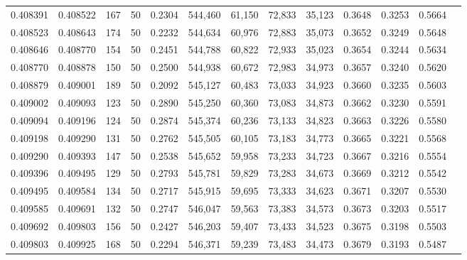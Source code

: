 \begin{tabular}{rrrrrrrrrrrrr}
0.408391 & 0.408522 &   167 &  50 &                                     0.2304 & 544,460 &  61,150 &  72,833 &  35,123 & 0.3648 & 0.3253 & 0.5664 \\
0.408523 & 0.408643 &   174 &  50 &                                     0.2232 & 544,634 &  60,976 &  72,883 &  35,073 & 0.3652 & 0.3249 & 0.5648 \\
0.408646 & 0.408770 &   154 &  50 &                                     0.2451 & 544,788 &  60,822 &  72,933 &  35,023 & 0.3654 & 0.3244 & 0.5634 \\
0.408770 & 0.408878 &   150 &  50 &                                     0.2500 & 544,938 &  60,672 &  72,983 &  34,973 & 0.3657 & 0.3240 & 0.5620 \\
0.408879 & 0.409001 &   189 &  50 &                                     0.2092 & 545,127 &  60,483 &  73,033 &  34,923 & 0.3660 & 0.3235 & 0.5603 \\
0.409002 & 0.409093 &   123 &  50 &                                     0.2890 & 545,250 &  60,360 &  73,083 &  34,873 & 0.3662 & 0.3230 & 0.5591 \\
0.409094 & 0.409196 &   124 &  50 &                                     0.2874 & 545,374 &  60,236 &  73,133 &  34,823 & 0.3663 & 0.3226 & 0.5580 \\
0.409198 & 0.409290 &   131 &  50 &                                     0.2762 & 545,505 &  60,105 &  73,183 &  34,773 & 0.3665 & 0.3221 & 0.5568 \\
0.409290 & 0.409393 &   147 &  50 &                                     0.2538 & 545,652 &  59,958 &  73,233 &  34,723 & 0.3667 & 0.3216 & 0.5554 \\
0.409396 & 0.409495 &   129 &  50 &                                     0.2793 & 545,781 &  59,829 &  73,283 &  34,673 & 0.3669 & 0.3212 & 0.5542 \\
0.409495 & 0.409584 &   134 &  50 &                                     0.2717 & 545,915 &  59,695 &  73,333 &  34,623 & 0.3671 & 0.3207 & 0.5530 \\
0.409585 & 0.409691 &   132 &  50 &                                     0.2747 & 546,047 &  59,563 &  73,383 &  34,573 & 0.3673 & 0.3203 & 0.5517 \\
0.409692 & 0.409803 &   156 &  50 &                                     0.2427 & 546,203 &  59,407 &  73,433 &  34,523 & 0.3675 & 0.3198 & 0.5503 \\
0.409803 & 0.409925 &   168 &  50 &                                     0.2294 & 546,371 &  59,239 &  73,483 &  34,473 & 0.3679 & 0.3193 & 0.5487 \\

\end{tabular}
